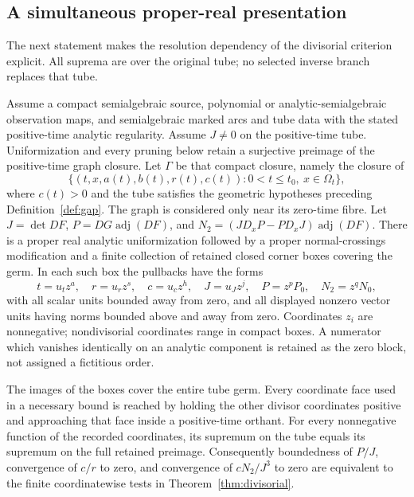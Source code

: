 \subsection{A simultaneous proper-real presentation}
The next statement makes the resolution dependency of the divisorial criterion explicit. All suprema are over the original tube; no selected inverse branch replaces that tube.

\begin{proposition}\label{prop:simultaneous}
Assume a compact semialgebraic source, polynomial or analytic-semialgebraic observation maps, and semialgebraic marked arcs and tube data with the stated positive-time analytic regularity. Assume $J\ne0$ on the positive-time tube. Uniformization and every pruning below retain a surjective preimage of the positive-time graph closure. Let $\Gamma$ be that compact closure, namely the closure of
\[
 \{(t,x,a(t),b(t),r(t),c(t)):0<t\le t_0,\ x\in\Omega_t\},
\]
where $c(t)>0$ and the tube satisfies the geometric hypotheses preceding Definition~\ref{def:gap}. The graph is considered only near its zero-time fibre. Let $J=\det DF$, $P=DG\operatorname{adj}(DF)$, and
$N_2=(JD_xP-PD_xJ)\operatorname{adj}(DF)$.
There is a proper real analytic uniformization followed by a proper normal-crossings modification and a finite collection of retained closed corner boxes covering the germ. In each such box the pullbacks have the forms
\[
 t=u_tz^a,\quad r=u_rz^s,\quad c=u_cz^h,\quad J=u_Jz^j,
 \quad P=z^pP_0,\quad N_2=z^qN_0,
\]
with all scalar units bounded away from zero, and all displayed nonzero vector units having norms bounded above and away from zero. Coordinates $z_i$ are nonnegative; nondivisorial coordinates range in compact boxes. A numerator which vanishes identically on an analytic component is retained as the zero block, not assigned a fictitious order.

The images of the boxes cover the entire tube germ. Every coordinate face used in a necessary bound is reached by holding the other divisor coordinates positive and approaching that face inside a positive-time orthant. For every nonnegative function of the recorded coordinates, its supremum on the tube equals its supremum on the full retained preimage. Consequently boundedness of $P/J$, convergence of $c/r$ to zero, and convergence of $cN_2/J^3$ to zero are equivalent to the finite coordinatewise tests in Theorem~\ref{thm:divisorial}.
\end{proposition}
